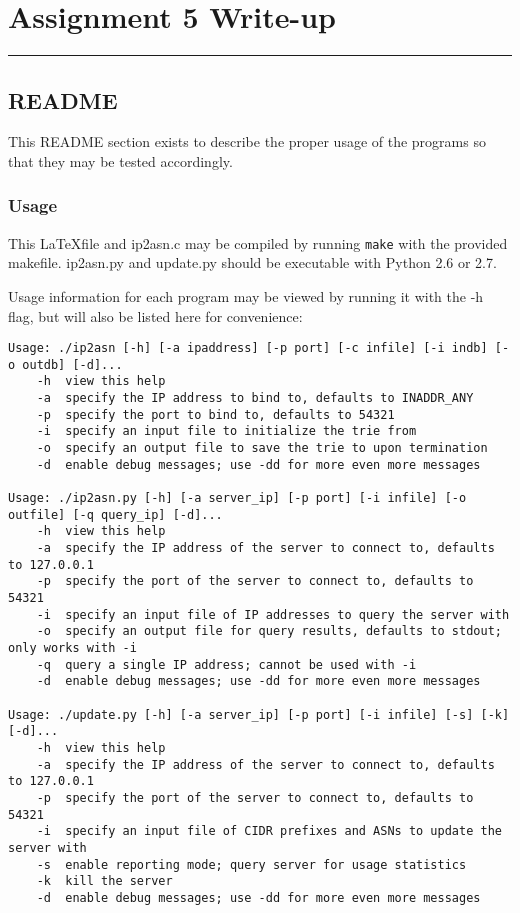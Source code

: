 \documentclass[letterpaper,10pt,fleqn]{article}
\numberwithin{equation}{section}
\begin{document}

\section*{Assignment 5 Write-up}
\hrule

\subsection*{README}
This README section exists to describe the proper usage of the programs so that they may be tested accordingly.

\subsubsection*{Usage}
This \LaTeX file and ip2asn.c may be compiled by running \texttt{make} with the provided makefile.  ip2asn.py and update.py should be executable with Python 2.6 or 2.7.

Usage information for each program may be viewed by running it with the -h flag, but will also be listed here for convenience:

\begin{verbatim}
Usage: ./ip2asn [-h] [-a ipaddress] [-p port] [-c infile] [-i indb] [-o outdb] [-d]...
    -h  view this help
    -a  specify the IP address to bind to, defaults to INADDR_ANY
    -p  specify the port to bind to, defaults to 54321
    -i  specify an input file to initialize the trie from
    -o  specify an output file to save the trie to upon termination
    -d  enable debug messages; use -dd for more even more messages

Usage: ./ip2asn.py [-h] [-a server_ip] [-p port] [-i infile] [-o outfile] [-q query_ip] [-d]...
    -h  view this help
    -a  specify the IP address of the server to connect to, defaults to 127.0.0.1
    -p  specify the port of the server to connect to, defaults to 54321
    -i  specify an input file of IP addresses to query the server with
    -o  specify an output file for query results, defaults to stdout; only works with -i
    -q  query a single IP address; cannot be used with -i
    -d  enable debug messages; use -dd for more even more messages

Usage: ./update.py [-h] [-a server_ip] [-p port] [-i infile] [-s] [-k] [-d]...
    -h  view this help
    -a  specify the IP address of the server to connect to, defaults to 127.0.0.1
    -p  specify the port of the server to connect to, defaults to 54321
    -i  specify an input file of CIDR prefixes and ASNs to update the server with
    -s  enable reporting mode; query server for usage statistics
    -k  kill the server
    -d  enable debug messages; use -dd for more even more messages
\end{verbatim}
\end{document}
